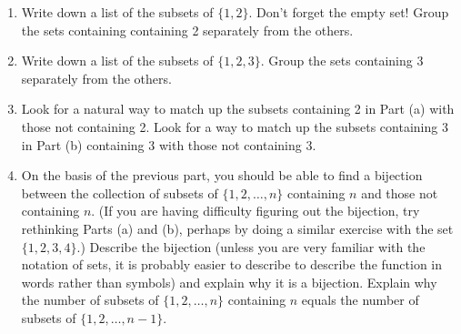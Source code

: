 \begin{enumerate}
\item Write down a list of the subsets of $\{ 1, 2 \}$.
Don't forget the empty set! Group the sets containing containing 2
separately from the others.
\item Write down a list of the subsets of $\{ 1, 2, 3 \}$. Group the sets
 containing 3 separately from the others.

\item Look for a natural way to match up the subsets containing 2 in
Part (a) with those not containing 2. Look for a way to match up
the subsets containing 3 in Part (b) containing 3 with those not
containing 3.

\item On the basis of the previous part, you should be able to find a
bijection between the collection of subsets of $\{1, 2, \ldots , n \}$
containing $n$ and those not containing $n$. (If you are having difficulty
figuring out the bijection, try rethinking Parts (a) and (b), perhaps by
doing a similar exercise with the set $\{1,2,3,4\}$.) Describe the
bijection (unless you are very familiar with the notation of sets, it is
probably easier to describe to describe the function in words rather than
symbols) and explain why it is a bijection. Explain why the number of
subsets of
$\{ 1, 2, \ldots , n \}$ containing
$n$ equals the number of subsets of $\{ 1, 2, \ldots, n-1 \}$. 


\end{enumerate}
